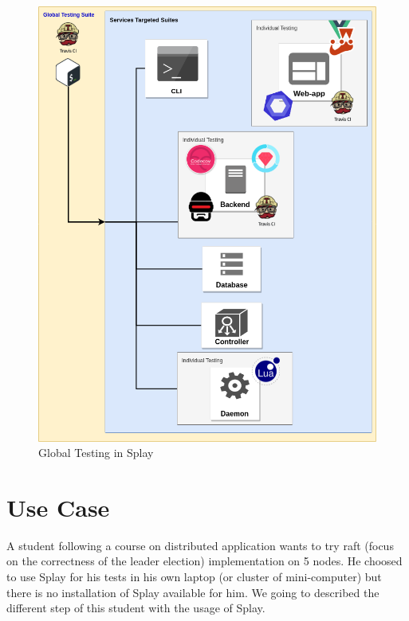 \documentclass{eplmastersthesis}
\begin{document}
      \begin{figure}[H]
        \centering
        \includegraphics[scale=0.6]{figures/global_testing.png}
        \caption{\label{global_testing} Global Testing in Splay}
      \end{figure}

  \chapter{Use Case}
    A student following a course on distributed application wants to try raft (focus on the correctness of the leader election)
    implementation on 5 nodes.
    He choosed to use Splay for his tests in his own laptop (or cluster of mini-computer) but there
    is no installation of Splay available for him.
    We going to described the different step of this student with the usage of Splay.
\end{document}
